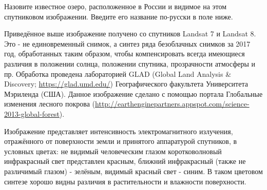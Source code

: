 
Назовите известное озеро, расположенное в России и видимое на этом спутниковом изображении. Введите его название по-русски в поле ниже. 


Приведённое выше изображение получено со спутников Landsat 7 и Landsat 8. Это - не единовременный снимок, 
а синтез ряда безоблачных снимков за 2017 год, обработанных таким образом, чтобы компенсировать всегда 
имеющиеся различия в положении солнца, положении спутника, прозрачности атмосферы и пр. 
Обработка проведена лабораторией GLAD (Global Land Analysis \& Discovery; \url{https://glad.umd.edu/}) Географического факультета Университета Мэриленда (США). 
Данное изображение сделано с помощью портала Глобальные изменения лесного покрова (\url{http://earthenginepartners.appspot.com/science-2013-global-forest}).

Изображение представляет интенсивность электромагнитного излучения, отражённого от поверхности земли и принятого аппаратурой спутников, в условных цветах: не видимый человеческим глазом коротковолновый инфракрасный свет представлен красным, ближний инфракрасный (также не различимый глазом) - зелёным, видимый красный свет - синим. В таком цветовом синтезе хорошо видны различия в растительности и влажности поверхности.

\soultionSection


